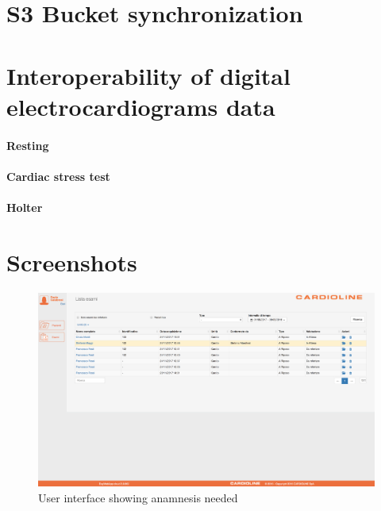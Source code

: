 \section{S3 Bucket synchronization}
\section{Interoperability of digital electrocardiograms data}
\paragraph{Resting}
\label{paragraph:Resting}
\paragraph{Cardiac stress test}
\label{paragraph:Cardiac stress test}
\paragraph{Holter}
\label{paragraph:Holter}

\section{Screenshots}
\begin{figure}[h]
    \includegraphics[width=\textwidth]{img/todo_anamnesi}
    \caption{User interface showing anamnesis needed}
    \label{fig:todo_anamnesi}
\end{figure}

